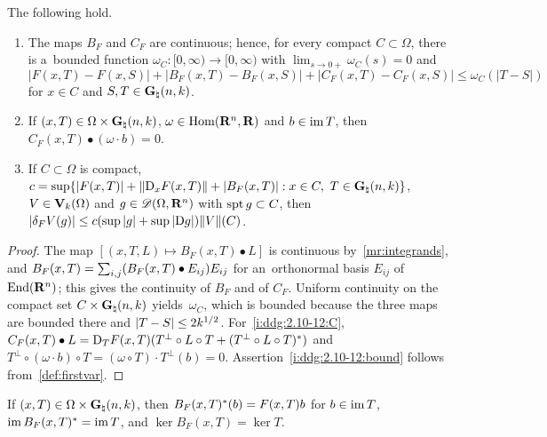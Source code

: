 \documentclass[a4paper,twoside,leqno]{article}
\newcommand{\Gk}{\pgrass{\adim}{\vdim}}        %
\begin{document}
\begin{lemma}
    \label{ddg:2.10-12}
    The following hold.
    \begin{enumerate}
        \item
        \label{i:ddg:2.10-12:cont}
        The maps $B_F$ and $C_F$ are continuous; hence, for every compact $C \subset \Omega$,
        there is a~bounded function $\omega_C : [0,\infty) \to [0,\infty)$ with $\lim_{s \to 0+}
        \omega_C(s) = 0$ and
        \begin{displaymath}
            |F(x,T) - F(x,S)| + |B_F(x,T) - B_F(x,S)| + |C_F(x,T) - C_F(x,S)| \le \omega_C(|T - S|)
        \end{displaymath}
        for $x \in C$ and $S, T \in \Gk$.
        \item
        \label{i:ddg:2.10-12:C}
        If $(x,T) \in \Omega \times \Gk$, $\omega \in \operatorname{Hom}(\mathbf{R}^{n},\mathbf{R})$ and $b \in \operatorname{im} T$, then
        $C_F(x,T) \bullet (\omega \cdot b) = 0$.
        \item
        \label{i:ddg:2.10-12:bound}
        If $C \subset \Omega$ is compact, $c = \sup \{ |F(x,T)| + \|\uD_x F(x,T)\| + |B_F(x,T)|
        : x \in C,\ T \in \Gk \}$, $V \in \mathbf{V}_{k}(\Omega)$ and $g \in
        \mathscr{D}(\Omega,\mathbf{R}^{n})$ with $\operatorname{spt} g \subset C$, then $|\delta_F V(g)| \le c (\sup |g|
        + \sup |\mathrm{D} g|) \|V\|(C)$.
    \end{enumerate}
\end{lemma}

\begin{proof}
    The map $[ (x,T,L) \mapsto B_F(x,T) \bullet L ]$ is continuous by~\ref{mr:integrands}, and
    $B_F(x,T) = {\textstyle\sum_{i,j}^{}} (B_F(x,T) \bullet E_{ij}) E_{ij}$ for an~orthonormal basis
    $E_{ij}$ of~$\mathrm{End}({\mathbf{R}^{n}})$; this gives the continuity of $B_F$ and of $C_F$. Uniform
    continuity on the compact set $C \times \Gk$ yields~$\omega_C$, which is bounded because the
    three maps are bounded there and $|T - S| \le 2 k^{1/2}$. For~\ref{i:ddg:2.10-12:C},
    $C_F(x,T) \bullet L = \mathrm{D}_T F(x,T)(T^\perp \circ L \circ T + (T^\perp \circ L
    \circ T)^{*})$ and $T^\perp \circ (\omega \cdot b) \circ T = (\omega \circ T) \cdot T^\perp(b) =
    0$. Assertion~\ref{i:ddg:2.10-12:bound} follows from~\ref{def:firstvar}.
\end{proof}

\begin{lemma}[new]
    \label{new:kerim}
    If $(x,T) \in \Omega \times \Gk$, then $B_F(x,T)^{*}(b) = F(x,T) b$ for $b \in \operatorname{im} T$,
    $\operatorname{im} B_F(x,T)^{*} = \operatorname{im} T$, and $\ker B_F(x,T) = \ker T$.
\end{lemma}
\end{document}
